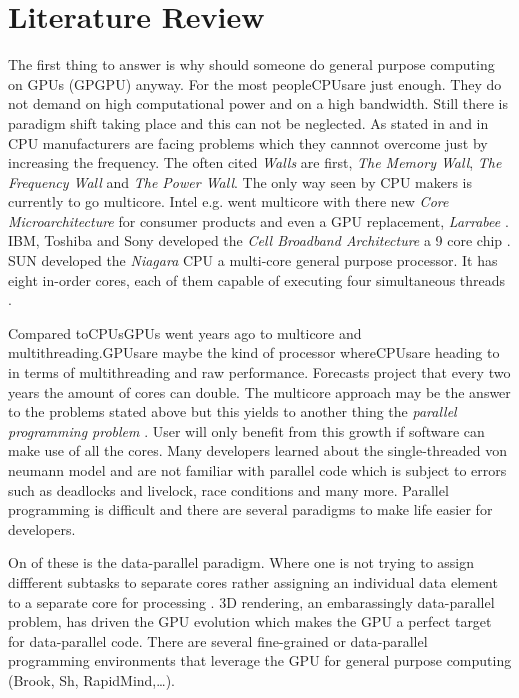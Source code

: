 \chapter{Literature Review}\label{ch:literature_review}
The first thing to answer is why should someone do general purpose computing on
GPUs (GPGPU) anyway. For the most people\glspl{CPU}are just enough. They do not
demand on high computational power and on a high bandwidth. Still there is
paradigm shift taking place and this can not be neglected. As stated in
\citep{citeulike:1187394} and in \citep{citeulike:3421647} CPU manufacturers are
facing problems which they cannnot overcome just by increasing the frequency.
The often cited \emph{Walls} are first, \emph{The Memory
Wall}\citep{citeulike:457955}, \emph{The Frequency Wall} and \emph{The Power
Wall}. The only way seen by CPU makers is currently to go multicore. Intel e.g.
went multicore with there new \emph{Core Microarchitecture} for consumer
products and even a \gls{GPU} replacement, \emph{Larrabee} \citep{citeulike:3153758}.
IBM, Toshiba and Sony developed the \emph{Cell Broadband Architecture} a 9 core
chip \citep{citeulike:1243173}. SUN developed the \emph{Niagara} CPU a multi-core
general purpose processor. It has eight in-order cores, each of them capable of
executing four simultaneous threads \citep{citeulike:3743958}.

Compared to\glspl{CPU}GPUs went years ago to multicore and multithreading.\glspl{GPU}are
maybe the kind of processor where\glspl{CPU}are heading to in terms of multithreading
and raw performance. Forecasts project that every two years the amount of cores
can double. The multicore approach may be the answer to the problems stated
above but this yields to another thing the \emph{parallel programming problem}
\citep{citeulike:3750573}. User will only benefit from this growth if software
can make use of all the cores. Many developers learned about the
single-threaded von neumann model and are not familiar with parallel code which
is subject to errors such as deadlocks and livelock, race conditions and many
more. Parallel programming is difficult and there are several paradigms to make
life easier for developers. 

On of these is the data-parallel paradigm. Where one
is not trying to assign diffferent subtasks to separate cores rather assigning
an individual data element to a separate core for processing
\citep{citeulike:3750565}. 3D rendering, an embarassingly data-parallel problem,
has driven the \gls{GPU} evolution which makes the \gls{GPU} a perfect target for
data-parallel code. There are several fine-grained or data-parallel programming
environments that leverage the \gls{GPU} for general purpose computing (Brook, Sh,
RapidMind,\ldots). 

